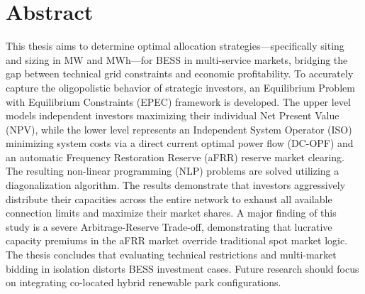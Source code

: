 \chapter*{Abstract}
\label{cha:abstract}
This thesis aims to determine optimal allocation strategies—specifically siting and sizing in MW and MWh—for BESS in multi-service markets, bridging the gap between technical grid constraints and economic profitability. To accurately capture the oligopolistic behavior of strategic investors, an Equilibrium Problem with Equilibrium Constraints (EPEC) framework is developed. The upper level models independent investors maximizing their individual Net Present Value (NPV), while the lower level represents an Independent System Operator (ISO) minimizing system costs via a direct current optimal power flow (DC-OPF) and an automatic Frequency Restoration Reserve (aFRR) reserve market clearing. The resulting non-linear programming (NLP) problems are solved utilizing a diagonalization algorithm. The results demonstrate that investors aggressively distribute their capacities across the entire network to exhaust all available connection limits and maximize their market shares. A major finding of this study is a severe Arbitrage-Reserve Trade-off, demonstrating that lucrative capacity premiums in the aFRR market override traditional spot market logic. The thesis concludes that evaluating technical restrictions and multi-market bidding in isolation distorts BESS investment cases. Future research should focus on integrating co-located hybrid renewable park configurations.

